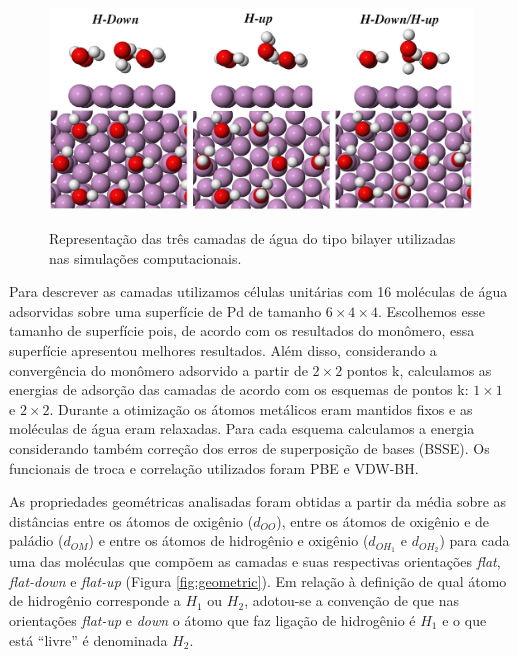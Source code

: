 \begin{figure}[b!]
	\centering
	\caption{Representação das três camadas de água do tipo bilayer utilizadas nas simulações computacionais. }
	\includegraphics[scale=0.3]{figs/complete2.png}
	\label{fig:complete}
\end{figure}  

Para descrever as camadas utilizamos células unitárias com 16 moléculas de água adsorvidas sobre uma superfície de Pd de tamanho $ 6\times4\times4 $. Escolhemos esse tamanho de superfície pois, de acordo com os resultados do monômero, essa superfície apresentou melhores resultados. Além disso, considerando a convergência do monômero adsorvido a partir de $2\times2$ pontos k, calculamos as energias de adsorção das camadas de acordo com os esquemas de pontos k: $1\times1$ e $2\times2$. Durante a otimização os átomos metálicos eram mantidos fixos e as moléculas de água eram relaxadas. Para cada esquema calculamos a energia considerando também correção dos erros de superposição de bases (BSSE). Os funcionais de troca e correlação utilizados foram PBE e VDW-BH.

As propriedades geométricas analisadas foram obtidas a partir da média sobre as distâncias entre os átomos de oxigênio (${d_{OO}}$), entre os átomos de oxigênio e de paládio (${d_{OM}}$) e entre os átomos de hidrogênio e oxigênio (${d_{OH_1}}$ e ${d_{OH_2}}$) para cada uma das moléculas que compõem as camadas e suas respectivas orientações \textit{flat}, \textit{flat-down} e \textit{flat-up} (Figura \ref{fig:geometric}). Em relação à definição de qual átomo de hidrogênio corresponde a $H_1$ ou $H_2$, adotou-se a convenção de que nas orientações \textit{flat-up} e \textit{down} o átomo que faz ligação de hidrogênio é $H_1$ e o que está ``livre'' é denominada $H_2$. 


